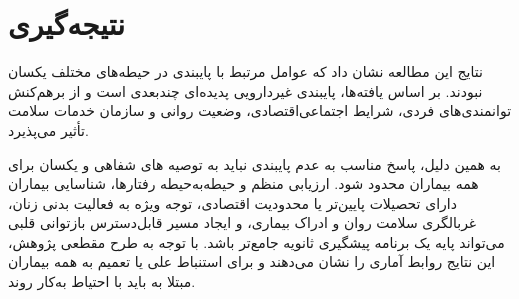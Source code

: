 \section{نتیجه‌گیری}

نتایج این مطالعه نشان داد که عوامل مرتبط با پایبندی در حیطه‌های مختلف یکسان نبودند. بر اساس یافته‌ها، پایبندی غیردارویی پدیده‌ای چندبعدی است و از برهم‌کنش توانمندی‌های فردی، شرایط اجتماعی‌اقتصادی، وضعیت روانی و سازمان خدمات سلامت تأثیر می‌پذیرد.

به همین دلیل، پاسخ مناسب به عدم پایبندی نباید به توصیه های شفاهی و یکسان برای همه بیماران محدود شود. ارزیابی منظم و حیطه‌به‌حیطه رفتارها، شناسایی بیماران دارای تحصیلات پایین‌تر یا محدودیت اقتصادی، توجه ویژه به فعالیت بدنی زنان، غربالگری سلامت روان و ادراک بیماری، و ایجاد مسیر قابل‌دسترس بازتوانی قلبی می‌تواند پایه یک برنامه پیشگیری ثانویه جامع‌تر باشد. با توجه به طرح مقطعی پژوهش، این نتایج روابط آماری را نشان می‌دهند و برای استنباط علی یا تعمیم به همه بیماران مبتلا به  باید با احتیاط به‌کار روند.

